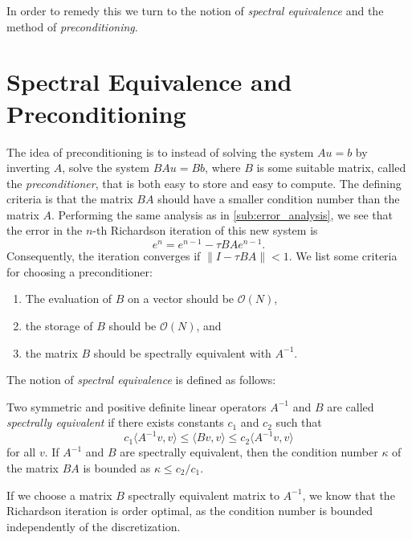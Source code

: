 In order to remedy this we turn to the notion of \emph{spectral equivalence}
and the method of \emph{preconditioning}.

\section{Spectral Equivalence and Preconditioning}
\label{sec:spectral_equivalence_and_preconditioning}

The idea of preconditioning is to instead of solving the system \( A u = b \)
by inverting \( A \), solve the system \( B A u = B b \), where \( B \) is some
suitable matrix, called the \emph{preconditioner}, that is both easy to store
and easy to compute. The defining criteria is that the matrix \( B A \) should
have a smaller condition number than the matrix \( A \). Performing the same
analysis as in \vref{sub:error_analysis}, we see that the error in the \(n\)-th
Richardson iteration of this new system is
\begin{equation}
    e^n = e^{n-1} - \tau B A e^{n-1}.
\end{equation}
Consequently, the iteration converges if \( \|I - \tau B A \| < 1 \).  We list
some criteria for choosing a preconditioner:
\begin{enumerate}
    \item The evaluation of \(B\) on a vector should be \( \mathcal{O}(N) \), 
    \item the storage of \(B\) should be \( \mathcal{O}(N) \), and
    \item the matrix \(B\) should be spectrally equivalent with \( A^{-1} \).
\end{enumerate}
The notion of \emph{spectral equivalence} is defined as follows:
\begin{definition}
    Two symmetric and positive definite linear operators \( A^{-1} \) and \( B
    \) are called \emph{spectrally equivalent} if there exists constants \( c_1
    \) and \( c_2 \) such that
    \begin{equation}
        c_1 \langle A^{-1}v, v \rangle \leq \langle Bv, v \rangle \leq c_2
        \langle A^{-1}v, v \rangle
    \end{equation}
    for all \( v \). If \( A^{-1} \) and \( B \) are spectrally equivalent,
    then the condition number \( \kappa \) of the matrix \( BA\) is bounded as
    \( \kappa \leq c_2 / c_1 \).
\end{definition}

If we choose a matrix \(B\) spectrally equivalent matrix to \( A^{-1} \), we
know that the Richardson iteration is order optimal, as the condition number is
bounded independently of the discretization.


